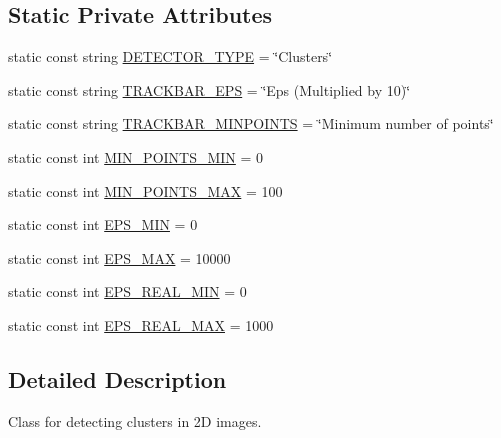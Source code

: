 \subsection*{\-Static \-Private \-Attributes}
\begin{DoxyCompactItemize}
\item 
static const string \hyperlink{classmultiscale_1_1analysis_1_1ClusterDetector_ae2eae436968e6f637208af7d5a9d93b1}{\-D\-E\-T\-E\-C\-T\-O\-R\-\_\-\-T\-Y\-P\-E} = \char`\"{}\-Clusters\char`\"{}
\item 
static const string \hyperlink{classmultiscale_1_1analysis_1_1ClusterDetector_a656f64f88c73c25824e5a4416a742aaf}{\-T\-R\-A\-C\-K\-B\-A\-R\-\_\-\-E\-P\-S} = \char`\"{}\-Eps (\-Multiplied by 10)\char`\"{}
\item 
static const string \hyperlink{classmultiscale_1_1analysis_1_1ClusterDetector_a7f0fbbf3de8479b106893c4a8161bdaf}{\-T\-R\-A\-C\-K\-B\-A\-R\-\_\-\-M\-I\-N\-P\-O\-I\-N\-T\-S} = \char`\"{}\-Minimum number of points\char`\"{}
\item 
static const int \hyperlink{classmultiscale_1_1analysis_1_1ClusterDetector_aa0219df3977a845e46be090e6c3f90ad}{\-M\-I\-N\-\_\-\-P\-O\-I\-N\-T\-S\-\_\-\-M\-I\-N} = 0
\item 
static const int \hyperlink{classmultiscale_1_1analysis_1_1ClusterDetector_aabb41b5c6e865ee33cbb27568cae5a2d}{\-M\-I\-N\-\_\-\-P\-O\-I\-N\-T\-S\-\_\-\-M\-A\-X} = 100
\item 
static const int \hyperlink{classmultiscale_1_1analysis_1_1ClusterDetector_a6c3517e03d1fd2c6b4d6cd0d81eb8684}{\-E\-P\-S\-\_\-\-M\-I\-N} = 0
\item 
static const int \hyperlink{classmultiscale_1_1analysis_1_1ClusterDetector_a76d0b4ecd2793d478317cc1bc856e06f}{\-E\-P\-S\-\_\-\-M\-A\-X} = 10000
\item 
static const int \hyperlink{classmultiscale_1_1analysis_1_1ClusterDetector_ad9542bde7e3bf36d501a0b203dc61e09}{\-E\-P\-S\-\_\-\-R\-E\-A\-L\-\_\-\-M\-I\-N} = 0
\item 
static const int \hyperlink{classmultiscale_1_1analysis_1_1ClusterDetector_a3e60b9e068a8addf9dd27382c74e6d62}{\-E\-P\-S\-\_\-\-R\-E\-A\-L\-\_\-\-M\-A\-X} = 1000
\end{DoxyCompactItemize}


\subsection{\-Detailed \-Description}
\-Class for detecting clusters in 2\-D images. 


